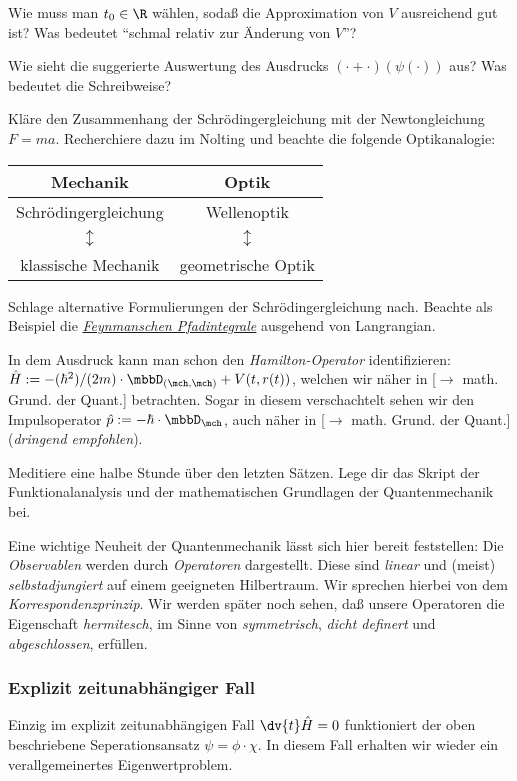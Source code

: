 \documentclass{subfiles}
\begin{document}
        \begin{Aufgabe}
            \nr{} Wie muss man $t_0\in\R$ wählen, sodaß die Approximation von $V$ ausreichend gut ist? Was bedeutet \enquote{schmal relativ zur Änderung von $V$}?

            \nr{} Wie sieht die suggerierte Auswertung des Ausdrucks $(\cdot +\cdot)(\psi(\cdot))$ aus? Was bedeutet die Schreibweise?

            \nr{} Kläre den Zusammenhang der Schrödingergleichung mit der Newtongleichung $F=ma$. Recherchiere dazu im Nolting und beachte die folgende Optikanalogie:
            \begin{table}[H]
                \centering
                \begin{tabular}{c|c}
                    \small{Mechanik} & \small{Optik} \\
                    \hline
                    \small{Schrödingergleichung} & 
                    \small{Wellenoptik} \\
                    \small{$\updownarrow$} & 
                    \small{$\updownarrow$} \\
                    \small{klassische Mechanik} & 
                    \small{geometrische Optik}
                \end{tabular}
            \end{table}

            \nr{} Schlage alternative Formulierungen der Schrödingergleichung nach. Beachte als Beispiel die \href{https://de.wikipedia.org/wiki/Pfadintegral}{\emph{Feynmanschen Pfadintegrale}} ausgehend von Langrangian. 
        \end{Aufgabe}
        In dem Ausdruck kann man schon den \emph{Hamilton-Operator} identifizieren: $\hat H := -(\hbar^2)/(2m)\cdot\mbbD_{(\mch,\mch)}+V(t,r(t))$, welchen wir näher in [$\to$ math. Grund. der Quant.] betrachten. Sogar in diesem verschachtelt sehen wir den Impulsoperator $\hat p :=-\hbar\cdot\mbbD_\mch$, auch näher in [$\to$ math. Grund. der Quant.] (\textit{dringend empfohlen}). 

        \begin{Aufgabe}
            \nr{} Meditiere eine halbe Stunde über den letzten Sätzen. Lege dir das Skript der Funktionalanalysis und der mathematischen Grundlagen der Quantenmechanik bei. 
        \end{Aufgabe}
        Eine wichtige Neuheit der Quantenmechanik lässt sich hier bereit feststellen: Die \emph{Observablen} werden durch \emph{Operatoren} dargestellt. Diese sind \emph{linear} und (meist) \emph{selbstadjungiert} auf einem geeigneten Hilbertraum. Wir sprechen hierbei von dem \emph{Korrespondenzprinzip}. Wir werden später noch sehen, daß unsere Operatoren die Eigenschaft \emph{hermitesch}, im Sinne von \emph{symmetrisch}, \emph{dicht definert} und \emph{abgeschlossen}, erfüllen. 

        \subsubsection*{Explizit zeitunabhängiger Fall}
            Einzig im explizit zeitunabhängigen Fall $\dv{t}\hat H = 0$ funktioniert der oben beschriebene Seperationsansatz $\psi = \phi\cdot\chi$. In diesem Fall erhalten wir wieder ein verallgemeinertes Eigenwertproblem. 
\end{document}
